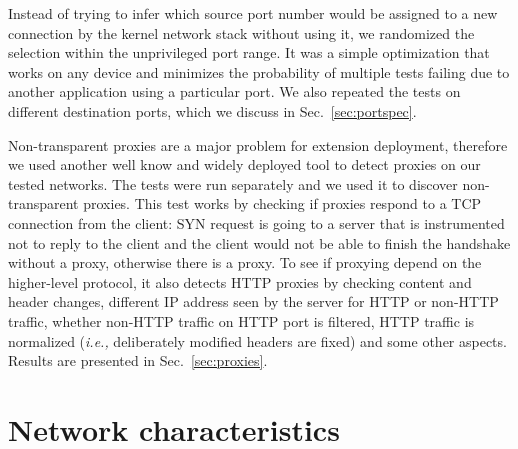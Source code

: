 \documentclass{sig-alternate-10pt}
\providecommand{\ie}{\emph{i.e.,} }
\begin{document}
Instead of trying to infer which source port number would be assigned to a new connection by the kernel network stack without using it, we randomized the selection within the unprivileged port range. It was a simple optimization that works on any device and minimizes the probability of multiple tests failing due to another application using a particular port. We also repeated the tests on different destination ports, which we discuss in Sec.~\ref{sec:portspec}.

Non-transparent proxies are a major problem for extension deployment, therefore we used another well know and widely deployed tool to detect proxies on our tested networks. The tests were run separately and we used it to discover non-transparent proxies. This test works by checking if proxies respond to a TCP connection from the client: SYN request is going to a server that is instrumented not to reply to the client and the client would not be able to finish the handshake without a proxy, otherwise there is a proxy. To see if proxying depend on the higher-level protocol, it also detects HTTP proxies by checking content and header changes, different IP address seen by the server for HTTP or non-HTTP traffic, whether non-HTTP traffic on HTTP port is filtered, HTTP traffic is normalized (\ie deliberately modified headers are fixed) and some other aspects. Results are presented in Sec.~\ref{sec:proxies}.

\section{Network characteristics}
\label{sec:network}
\end{document}
